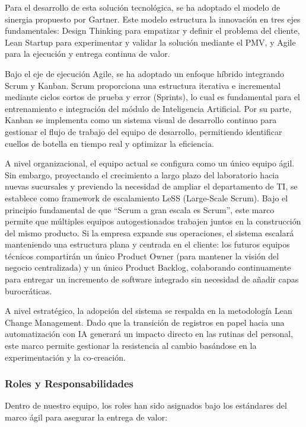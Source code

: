 \documentclass[12pt,a4paper]{article}
\begin{document}
Para el desarrollo de esta solución tecnológica, se ha adoptado el modelo de sinergia propuesto por Gartner. Este modelo estructura la innovación en tres ejes fundamentales: Design Thinking para empatizar y definir el problema del cliente, Lean Startup para experimentar y validar la solución mediante el PMV, y Agile para la ejecución y entrega continua de valor.

Bajo el eje de ejecución Agile, se ha adoptado un enfoque híbrido integrando Scrum y Kanban. Scrum proporciona una estructura iterativa e incremental mediante ciclos cortos de prueba y error (Sprints), lo cual es fundamental para el entrenamiento e integración del módulo de Inteligencia Artificial. Por su parte, Kanban se implementa como un sistema visual de desarrollo continuo para gestionar el flujo de trabajo del equipo de desarrollo, permitiendo identificar cuellos de botella en tiempo real y optimizar la eficiencia.

A nivel organizacional, el equipo actual se configura como un único equipo ágil. Sin embargo, proyectando el crecimiento a largo plazo del laboratorio hacia nuevas sucursales y previendo la necesidad de ampliar el departamento de TI, se establece como framework de escalamiento LeSS (Large-Scale Scrum). Bajo el principio fundamental de que ``Scrum a gran escala es Scrum'', este marco permite que múltiples equipos autogestionados trabajen juntos en la construcción del mismo producto. Si la empresa expande sus operaciones, el sistema escalará manteniendo una estructura plana y centrada en el cliente: los futuros equipos técnicos compartirán un único Product Owner (para mantener la visión del negocio centralizada) y un único Product Backlog, colaborando continuamente para entregar un incremento de software integrado sin necesidad de añadir capas burocráticas.

A nivel estratégico, la adopción del sistema se respalda en la metodología Lean Change Management. Dado que la transición de registros en papel hacia una automatización con IA generará un impacto directo en las rutinas del personal, este marco permite gestionar la resistencia al cambio basándose en la experimentación y la co-creación.

\subsubsection{Roles y Responsabilidades}

Dentro de nuestro equipo, los roles han sido asignados bajo los estándares del marco ágil para asegurar la entrega de valor:
\end{document}
